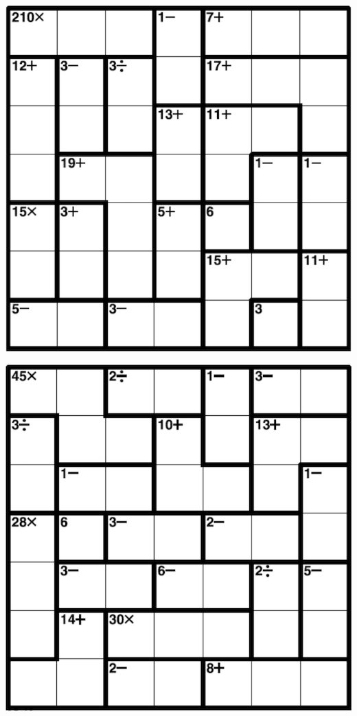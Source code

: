 
\includegraphics[scale=1]{Gambar/Lampiran/7x7_1.png}

\includegraphics[scale=1]{Gambar/Lampiran/7x7_2.png}
